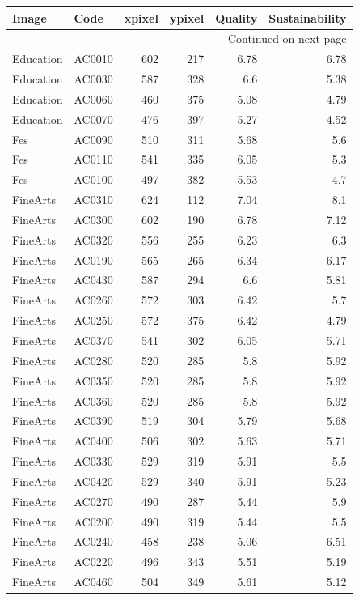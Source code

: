 \documentclass[article,10pt,microtype]{article}
\begin{document}
\begin{longtable}{llrrrr}
\label{academic}
\\
Image & Code & xpixel & ypixel & Quality & Sustainability\\
\hline
\endhead
\hline\multicolumn{6}{r}{Continued on next page} \\
\endfoot
\endlastfoot
Education & AC0010 & 602 & 217 & 6.78 & 6.78\\
Education & AC0030 & 587 & 328 & 6.6 & 5.38\\
Education & AC0060 & 460 & 375 & 5.08 & 4.79\\
Education & AC0070 & 476 & 397 & 5.27 & 4.52\\
Fes & AC0090 & 510 & 311 & 5.68 & 5.6\\
Fes & AC0110 & 541 & 335 & 6.05 & 5.3\\
Fes & AC0100 & 497 & 382 & 5.53 & 4.7\\
FineArts & AC0310 & 624 & 112 & 7.04 & 8.1\\
FineArts & AC0300 & 602 & 190 & 6.78 & 7.12\\
FineArts & AC0320 & 556 & 255 & 6.23 & 6.3\\
FineArts & AC0190 & 565 & 265 & 6.34 & 6.17\\
FineArts & AC0430 & 587 & 294 & 6.6 & 5.81\\
FineArts & AC0260 & 572 & 303 & 6.42 & 5.7\\
FineArts & AC0250 & 572 & 375 & 6.42 & 4.79\\
FineArts & AC0370 & 541 & 302 & 6.05 & 5.71\\
FineArts & AC0280 & 520 & 285 & 5.8 & 5.92\\
FineArts & AC0350 & 520 & 285 & 5.8 & 5.92\\
FineArts & AC0360 & 520 & 285 & 5.8 & 5.92\\
FineArts & AC0390 & 519 & 304 & 5.79 & 5.68\\
FineArts & AC0400 & 506 & 302 & 5.63 & 5.71\\
FineArts & AC0330 & 529 & 319 & 5.91 & 5.5\\
FineArts & AC0420 & 529 & 340 & 5.91 & 5.23\\
FineArts & AC0270 & 490 & 287 & 5.44 & 5.9\\
FineArts & AC0200 & 490 & 319 & 5.44 & 5.5\\
FineArts & AC0240 & 458 & 238 & 5.06 & 6.51\\
FineArts & AC0220 & 496 & 343 & 5.51 & 5.19\\
FineArts & AC0460 & 504 & 349 & 5.61 & 5.12\\

\end{longtable}
\end{document}
